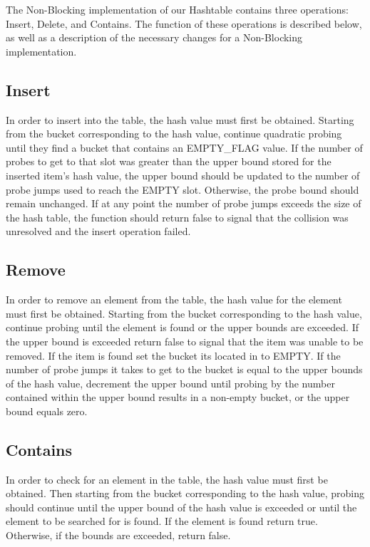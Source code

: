 \documentclass[journal]{IEEEtran}
\begin{document}
The Non-Blocking implementation of our Hashtable contains three operations: Insert, Delete, and Contains. The function of these operations is described below, as well as a description of the necessary changes for a Non-Blocking implementation.

\subsection{Insert}
In order to insert into the table, the hash value must first be obtained. Starting from the bucket corresponding to the hash value, continue quadratic probing until they find a bucket that contains an EMPTY\_FLAG value. If the number of probes to get to that slot was greater than the upper bound stored for the inserted item's hash value, the upper bound should be updated to the number of probe jumps used to reach the EMPTY slot. Otherwise, the probe bound should remain unchanged. If at any point the number of probe jumps exceeds the size of the hash table, the function should return false to signal that the collision was unresolved and the insert operation failed.

\subsection{Remove}
In order to remove an element from the table, the hash value for the element must first be obtained. Starting from the bucket corresponding to the hash value, continue probing until the element is found or the upper bounds are exceeded. If the upper bound is exceeded return false to signal that the item was unable to be removed. If the item is found set the bucket its located in to EMPTY. If the number of probe jumps it takes to get to the bucket is equal to the upper bounds of the hash value, decrement the upper bound until probing by the number contained within the upper bound results in a non-empty bucket, or the upper bound equals zero.

\subsection{Contains}
In order to check for an element in the table, the hash value must first be obtained. Then starting from the bucket corresponding to the hash value, probing should continue until the upper bound of the hash value is exceeded or until the element to be searched for is found. If the element is found return true. Otherwise, if the bounds are exceeded, return false.
\end{document}
